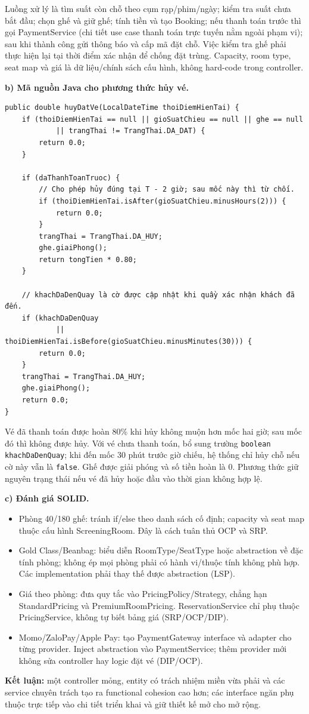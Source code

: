 \documentclass[11pt,a4paper]{article}
\begin{document}
Luồng xử lý là tìm suất còn chỗ theo cụm rạp/phim/ngày; kiểm tra suất chưa bắt đầu; chọn ghế và giữ ghế; tính tiền và tạo Booking; nếu thanh toán trước thì gọi PaymentService (chi tiết use case thanh toán trực tuyến nằm ngoài phạm vi); sau khi thành công gửi thông báo và cấp mã đặt chỗ. Việc kiểm tra ghế phải thực hiện lại tại thời điểm xác nhận để chống đặt trùng. Capacity, room type, seat map và giá là dữ liệu/chính sách cấu hình, không hard-code trong controller.

\newpage
\textbf{b) Mã nguồn Java cho phương thức hủy vé.}

\begin{verbatim}
public double huyDatVe(LocalDateTime thoiDiemHienTai) {
    if (thoiDiemHienTai == null || gioSuatChieu == null || ghe == null
            || trangThai != TrangThai.DA_DAT) {
        return 0.0;
    }

    if (daThanhToanTruoc) {
        // Cho phép hủy đúng tại T - 2 giờ; sau mốc này thì từ chối.
        if (thoiDiemHienTai.isAfter(gioSuatChieu.minusHours(2))) {
            return 0.0;
        }
        trangThai = TrangThai.DA_HUY;
        ghe.giaiPhong();
        return tongTien * 0.80;
    }

    // khachDaDenQuay là cờ được cập nhật khi quầy xác nhận khách đã đến.
    if (khachDaDenQuay
            || thoiDiemHienTai.isBefore(gioSuatChieu.minusMinutes(30))) {
        return 0.0;
    }
    trangThai = TrangThai.DA_HUY;
    ghe.giaiPhong();
    return 0.0;
}
\end{verbatim}

Vé đã thanh toán được hoàn 80\% khi hủy không muộn hơn mốc hai giờ; sau mốc đó thì không được hủy. Với vé chưa thanh toán, bổ sung trường \texttt{boolean khachDaDenQuay}; khi đến mốc 30 phút trước giờ chiếu, hệ thống chỉ hủy chỗ nếu cờ này vẫn là \texttt{false}. Ghế được giải phóng và số tiền hoàn là 0. Phương thức giữ nguyên trạng thái nếu vé đã hủy hoặc đầu vào thời gian không hợp lệ.

\textbf{c) Đánh giá SOLID.}
\begin{itemize}[leftmargin=1.05cm,itemsep=1pt]
  \item Phòng 40/180 ghế: tránh if/else theo danh sách cố định; capacity và seat map thuộc cấu hình ScreeningRoom. Đây là cách tuân thủ OCP và SRP.
  \item Gold Class/Beanbag: biểu diễn RoomType/SeatType hoặc abstraction về đặc tính phòng; không ép mọi phòng phải có hành vi/thuộc tính không phù hợp. Các implementation phải thay thế được abstraction (LSP).
  \item Giá theo phòng: đưa quy tắc vào PricingPolicy/Strategy, chẳng hạn StandardPricing và PremiumRoomPricing. ReservationService chỉ phụ thuộc PricingService, không tự biết bảng giá (SRP/OCP/DIP).
  \item Momo/ZaloPay/Apple Pay: tạo PaymentGateway interface và adapter cho từng provider. Inject abstraction vào PaymentService; thêm provider mới không sửa controller hay logic đặt vé (DIP/OCP).
\end{itemize}

\textbf{Kết luận:} một controller mỏng, entity có trách nhiệm miền vừa phải và các service chuyên trách tạo ra functional cohesion cao hơn; các interface ngăn phụ thuộc trực tiếp vào chi tiết triển khai và giữ thiết kế mở cho mở rộng.
\end{document}
